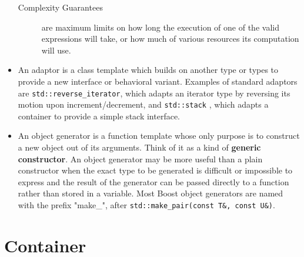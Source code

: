 \documentclass[a4paper,11pt,twoside]{book}
\begin{document}
\begin{itemize}
\begin{description}
	\item[Complexity Guarantees] are maximum limits on how long the execution of one of the valid expressions will take, or how much of various resources its computation will use.
\end{description}

\item An adaptor is a class template which builds on another type or types to provide a new interface or behavioral variant. Examples of standard adaptors are \texttt{std::reverse\_iterator}, which adapts an iterator type by reversing its motion upon increment/decrement, and \texttt{std::stack} , which adapts a container to provide a simple stack interface.
	
\item An object generator is a function template whose only purpose is to construct a new object out of its arguments. Think of it as a kind of \textbf{generic constructor}. An object generator may be more useful than a plain constructor when the exact type to be generated is difficult or impossible to express and the result of the generator can be passed directly to a function rather than stored in a variable. Most Boost object generators are named with the prefix "make\_", after \texttt{std::make\_pair(const T\&, const U\&)}.
	
\end{itemize}


\section{Container}
\end{document}

